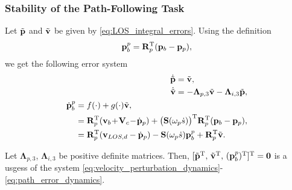 \subsubsection{Stability of the Path-Following Task}
Let $\Tilde{\mathbf{p}}$ and $\Tilde{\mathbf{v}}$ be given by \eqref{eq:LOS_integral_errors}. Using the definition
\begin{equation}
    \mathbf{p}_b^p = \mathbf{R}_p^{\mathrm{T}}(\mathbf{p}_b - \mathbf{p}_p),
\end{equation}
we get the following error system
\begin{subequations}
\begin{align}
\begin{split}\label{eq:velocity_perturbation_dynamics}
        \dot{\Tilde{\mathbf{p}}} &= \Tilde{\mathbf{v}},\\
        \dot{\Tilde{\mathbf{v}}} &= -\mathbf{\Lambda}_{p,3} \Tilde{\mathbf{v}} - \mathbf{\Lambda}_{i,3}\Tilde{\mathbf{p}},
        \end{split}\\
        \begin{split}
            \dot{\mathbf{p}}_b^p &= f(\cdot) + g(\cdot) \Tilde{\mathbf{v}},\\
            &= \mathbf{R}_p^{\mathrm{T}}(\mathbf{v}_b \!+\! \mathbf{V}_c\!-\!\dot{\mathbf{p}}_p) +  \bigl(\mathbf{S}(\omega_p \dot{s})\bigr)^{\mathrm{T}}\mathbf{R}_p^{\mathrm{T}}(\mathbf{p}_b - \mathbf{p}_p),\\
            &= \mathbf{R}_p^{\mathrm{T}}(\mathbf{v}_{LOS,d} -\dot{\mathbf{p}}_p) - \mathbf{S}(\omega_p \dot{s})\mathbf{p}_b^p +\mathbf{R}_p^{\mathrm{T}}\Tilde{\mathbf{v}}.\label{eq:path_error_dynamics}
        \end{split} 
\end{align}
\end{subequations}
\begin{theorem}\label{theorem:path_error}
    Let $\bm{\Lambda}_{p,3}$, $\bm{\Lambda}_{i,3}$ be positive definite matrices. Then, $[\Tilde{\mathbf{p}}^{\mathrm{T}},\, \Tilde{\mathbf{v}}^{\mathrm{T}}, \,(\mathbf{p}_b^p)^{\mathrm{T}}]^{\mathrm{T}} = \mathbf{0}$ is a \glspl{usges} of the system \eqref{eq:velocity_perturbation_dynamics}-\eqref{eq:path_error_dynamics}.    
\end{theorem}


